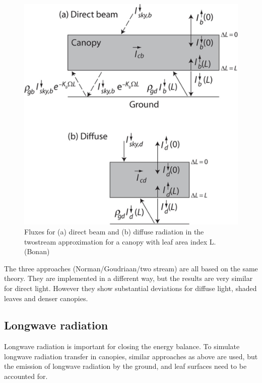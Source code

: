 \documentclass[12pt,oneside]{book}
\begin{document}
\begin{figure}

{\centering \includegraphics[width=0.8\linewidth]{figures/chap3/f321_two_stream} 

}

\caption{Fluxes for (a) direct beam and (b) diffuse radiation in the twostream approximation for a canopy with leaf area index L.(Bonan)}\label{fig:f321}
\end{figure}

The three approaches (Norman/Goudriaan/two stream) are all based on the
same theory. They are implemented in a different way, but the results
are very similar for direct light. However they show substantial
deviations for diffuse light, shaded leaves and denser canopies.

\subsection{Longwave radiation}\label{longwave-radiation}

Longwave radiation is important for closing the energy balance. To
simulate longwave radiation transfer in canopies, similar approaches as
above are used, but the emission of longwave radiation by the ground,
and leaf surfaces need to be accounted for.
\end{document}
